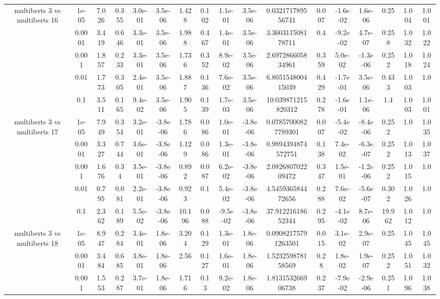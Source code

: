 \begin{tabular}{|c|c|c|c|c|c|c|c|c|c|c|c|c|c|c|c|c|}
\hline
\multirow{5}{*}{multiberts 3 vs multiberts 16} & 1e-05 & 7.026 & 0.355 & 3.0e-01 & 3.5e-06 & 1.428 & 0.102 & 1.1e-01 & 3.5e-06 & 0.032171789556741 & 0.007 & -1.6e-02 & 1.6e-06 & 0.25 & 1.004 & 1.001 \\
 & 0.0001 & 3.419 & 0.646 & 3.3e-01 & 3.5e-06 & 1.988 & 0.467 & 1.4e-01 & 3.5e-06 & 3.360311508178711 & 0.4 & -9.2e-02 & 4.7e-07 & 0.258 & 1.032 & 1.022 \\
 & 0.001 & 1.857 & 0.233 & 3.3e-01 & 3.5e-06 & 1.736 & 0.352 & 8.9e-02 & 3.5e-06 & 2.697286605834961 & 0.359 & 5.0e-02 & -1.3e-06 & 0.252 & 1.018 & 1.024 \\
 & 0.01 & 1.773 & 0.305 & 2.4e-01 & 3.5e-06 & 1.887 & 0.136 & 7.6e-02 & 3.5e-06 & 6.805154800415039 & 0.429 & -1.7e-01 & 3.5e-06 & 0.433 & 1.003 & 1.0 \\
 & 0.1 & 3.511 & 0.165 & 9.4e-02 & 3.5e-06 & 1.905 & 0.139 & 1.7e-03 & 3.5e-06 & 10.039871215820312 & 0.278 & -1.6e-01 & 1.1e-06 & 1.4 & 1.003 & 1.001 \\
\hline
\multirow{5}{*}{multiberts 3 vs multiberts 17} & 1e-05 & 7.949 & 0.354 & 3.2e-01 & -3.8e-06 & 1.786 & 0.086 & 1.0e-01 & -3.8e-06 & 0.07857000827789301 & 0.007 & -5.4e-02 & -8.4e-06 & 0.252 & 1.0 & 1.035 \\
 & 0.0001 & 3.327 & 0.744 & 3.6e-01 & -3.8e-06 & 1.129 & 0.086 & 1.3e-01 & -3.8e-06 & 0.9894394874572751 & 0.138 & 7.4e-02 & -6.3e-07 & 0.252 & 1.013 & 1.037 \\
 & 0.001 & 1.676 & 0.34 & 3.5e-01 & -3.8e-06 & 0.892 & 0.087 & 6.2e-02 & -3.8e-06 & 2.082680702209472 & 0.347 & 1.5e-01 & -1.2e-06 & 0.252 & 1.015 & 1.0 \\
 & 0.01 & 0.795 & 0.081 & 2.2e-01 & -3.8e-06 & 0.923 & 0.1 & 5.4e-02 & -3.8e-06 & 4.545936584472656 & 0.288 & 7.6e-02 & -5.6e-07 & 0.302 & 1.026 & 1.0 \\
 & 0.1 & 2.362 & 0.189 & 5.5e-02 & -3.8e-06 & 10.196 & 0.088 & -9.5e-02 & -3.8e-06 & 37.91221618652344 & 0.295 & -4.1e-02 & 8.7e-06 & 19.962 & 1.012 & 1.0 \\
\hline
\multirow{5}{*}{multiberts 3 vs multiberts 18} & 1e-05 & 8.947 & 0.284 & 3.4e-01 & 1.8e-06 & 3.204 & 0.129 & 1.3e-01 & 1.8e-06 & 0.09082175791263501 & 0.015 & 3.1e-02 & 2.9e-07 & 0.25 & 1.045 & 1.045 \\
 & 0.0001 & 3.484 & 0.685 & 3.8e-01 & 1.8e-06 & 2.56 & 0.127 & 1.6e-01 & 1.8e-06 & 1.523259878158569 & 0.28 & 1.8e-02 & 1.9e-07 & 0.252 & 1.051 & 1.032 \\
 & 0.001 & 1.553 & 0.287 & 3.7e-01 & 1.8e-06 & 1.716 & 0.13 & 9.2e-02 & 1.8e-06 & 1.813153266906738 & 0.237 & -7.9e-02 & -2.9e-06 & 0.251 & 1.096 & 1.038 \\

\end{tabular}
